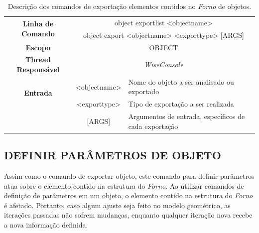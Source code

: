 \begin{center}
	\begin{table}[!htbp]
		\begin{tabularx}{\textwidth}{c|c|X}
			\toprule
			\multirow{2}{*}{\textbf{Linha de Comando}} & \multicolumn{2}{c}{object export\underline{\space\space}list <object\underline{\space\space}name>} \\
			& \multicolumn{2}{c}{object export <object\underline{\space\space}name> <export\underline{\space\space}type> [ARGS]} \\
			\midrule
			\textbf{Escopo} & \multicolumn{2}{c}{OBJECT} \\
			\hline
			\textbf{Thread Responsável} & \multicolumn{2}{c}{\textit{WiseConsole}} \\
			\hline
			\multirow{2}{*}{\textbf{Entrada}} &  <object\underline{\space\space}name> & Nome do objeto a ser analisado ou exportado \\
			&  <export\underline{\space\space}type> & Tipo de exportação a ser realizada \\
			&  [ARGS] & Argumentos de entrada, específicos de cada exportação \\
			\bottomrule
		\end{tabularx}
		\caption{Descrição dos comandos de exportação elementos contidos no \textit{Forno} de objetos.}
		\label{tab:export_object}
	\end{table}
\end{center}

\subsection{DEFINIR PARÂMETROS DE OBJETO}\label{sec:set_field_object}

Assim como o comando de exportar objeto, este comando para definir parâmetros atua sobre o elemento contido na estrutura do \textit{Forno}. Ao utilizar comandos de definição de parâmetros em um objeto, o elemento contido na estrutura do \textit{Forno} é afetado. Portanto, caso algum ajuste seja feito no modelo geométrico, as iterações passadas não sofrem mudanças, enquanto qualquer iteração nova recebe a nova informação definida.

